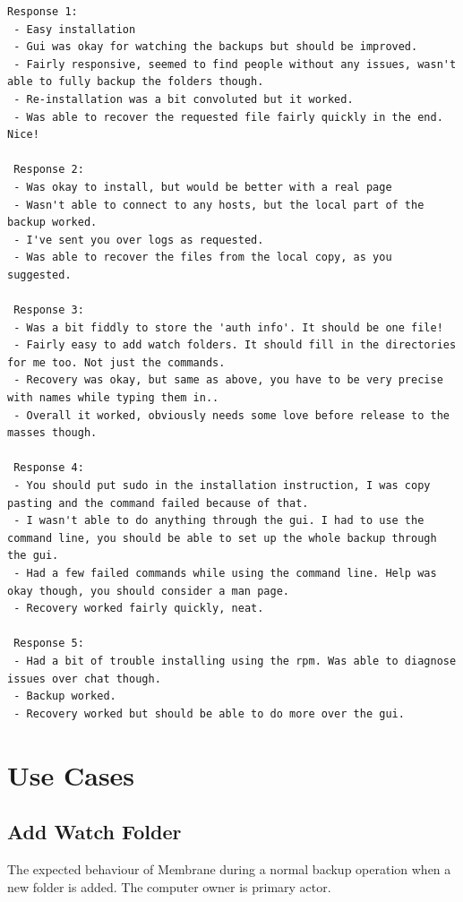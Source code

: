 \documentclass[11pt, a4paper, twoside]{report}
\begin{document}
\begin{lstlisting}[language=RsT, caption=Membrane Hallway Test Feedback, label=lst:mbrntestresult]
 Response 1:
 - Easy installation
 - Gui was okay for watching the backups but should be improved.
 - Fairly responsive, seemed to find people without any issues, wasn't able to fully backup the folders though.
 - Re-installation was a bit convoluted but it worked.
 - Was able to recover the requested file fairly quickly in the end. Nice!
  
 Response 2:
 - Was okay to install, but would be better with a real page
 - Wasn't able to connect to any hosts, but the local part of the backup worked.
 - I've sent you over logs as requested.
 - Was able to recover the files from the local copy, as you suggested.
 
 Response 3:
 - Was a bit fiddly to store the 'auth info'. It should be one file!
 - Fairly easy to add watch folders. It should fill in the directories for me too. Not just the commands.
 - Recovery was okay, but same as above, you have to be very precise with names while typing them in..
 - Overall it worked, obviously needs some love before release to the masses though.
  
 Response 4:
 - You should put sudo in the installation instruction, I was copy pasting and the command failed because of that.
 - I wasn't able to do anything through the gui. I had to use the command line, you should be able to set up the whole backup through the gui.
 - Had a few failed commands while using the command line. Help was okay though, you should consider a man page.
 - Recovery worked fairly quickly, neat.
 
 Response 5:
 - Had a bit of trouble installing using the rpm. Was able to diagnose issues over chat though.
 - Backup worked.
 - Recovery worked but should be able to do more over the gui.
\end{lstlisting}

\section{Use Cases} \label{sec:apdx-usecase}

\subsection{Add Watch Folder}
The expected behaviour of Membrane during a normal backup operation when a new folder is added. The computer owner is primary actor.
\end{document}
